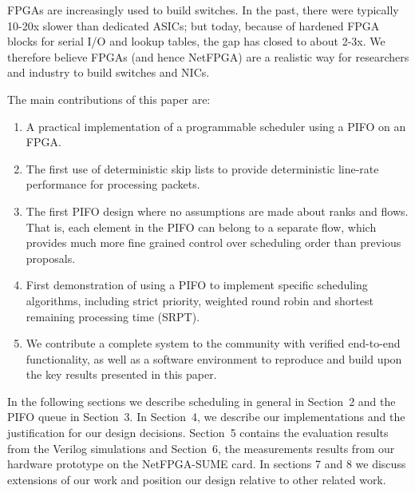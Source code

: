 FPGAs are increasingly used to build switches. In the past, there were typically 10-20x slower than dedicated ASICs; but today, because of hardened FPGA blocks for serial I/O and lookup tables, the gap has closed to about 2-3x. We therefore believe FPGAs (and hence NetFPGA) are a realistic way for researchers and industry to build switches and NICs. 

The main contributions of this paper are:
\begin{enumerate}
\item A practical implementation of a programmable scheduler using a PIFO on an FPGA.
\item The first use of deterministic skip lists to provide deterministic line-rate performance for processing packets.
\item The first PIFO design where no assumptions are made about ranks and flows. That is, each element in the PIFO can belong to a separate flow, which provides much more fine grained control over scheduling order than previous proposals.
\item First demonstration of using a PIFO to implement specific scheduling algorithms, including strict priority, weighted round robin and shortest remaining processing time (SRPT).
\item We contribute a complete system to the community with verified end-to-end functionality, as well as a software environment to reproduce and build upon the key results presented in this paper.
\end{enumerate}

In the following sections we describe scheduling in general in Section~2 and the PIFO queue in Section~3.  In Section~4, we describe our implementations and the justification for our design decisions.  Section~5 contains the evaluation results from the Verilog simulations and Section~6, the measurements results from our hardware prototype on the NetFPGA-SUME card.   In sections 7 and 8 we discuss extensions of our work and position our design relative to other related work.
